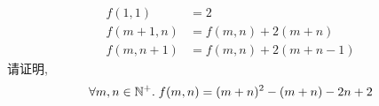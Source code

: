 \begin{frame}{}
  \begin{exampleblock}{}
    \begin{align*}
      f(1, 1) &= 2 \\
      f(m+1, n) &= f(m,n) + 2(m+n) \\
      f(m, n+1) &= f(m,n) + 2(m+n-1)
    \end{align*}
    请证明,
    \[
      \forall m, n \in \mathbb{N}^{+}.\; f(m,n) = (m+n)^{2} - (m+n) - 2n + 2
    \]
  \end{exampleblock}

  \pause
  \begin{center}
  \end{center}
\end{frame}
